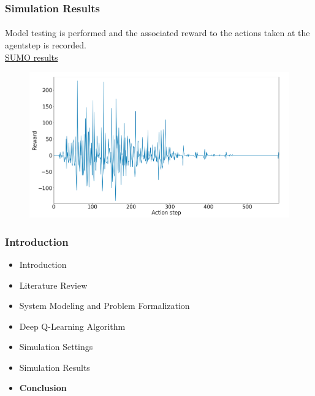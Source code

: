 \documentclass[aspectratio=169]{beamer}
\begin{document}
\begin{frame}
\frametitle{Simulation Results}
\framesubtitle{}
\vspace{1cm}
\begin{minipage}{0.4\textwidth}
Model testing is performed and the associated reward to
the actions taken at the agentstep is recorded.\\

\href{https://github.com/Reinforcement-Learning-F22/Traffic-Signal-Control-using-Deep-Q-Learning}{SUMO results} 

\end{minipage}%
\hfill
\begin{minipage}{0.6\textwidth}
\begin{figure}
    \centering
    \includegraphics[width=1\linewidth]{images/test_reward.png}
\end{figure}
\end{minipage}
\end{frame}
\begin{frame}
\frametitle{Introduction}
\begin{itemize}
  \item  Introduction
  \item Literature Review
  \item System Modeling and Problem Formalization
  \item Deep Q-Learning Algorithm
  \item Simulation Settings
  \item Simulation Results
  \item {\color{cor1}\textbf{Conclusion}}
\end{itemize}

\end{frame}
\end{document}
